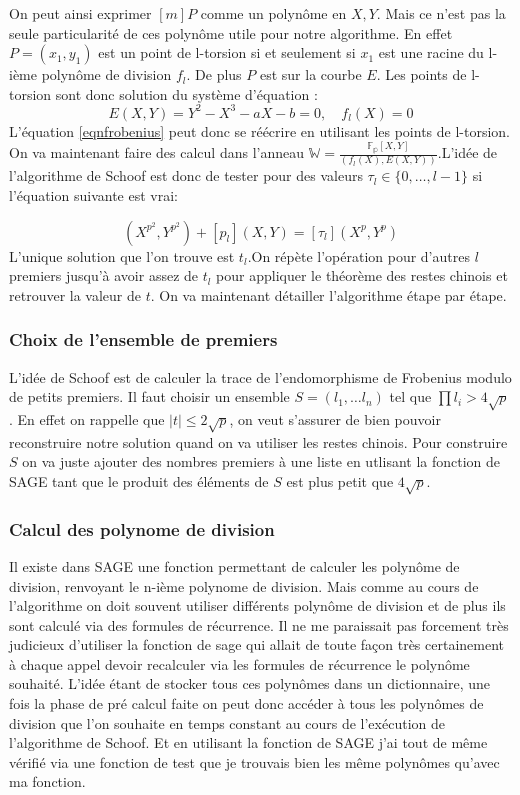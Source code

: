 \documentclass{article}
\begin{document}
On peut ainsi exprimer $[m]P$ comme un polynôme en $X,Y$. Mais ce n'est pas la seule particularité de ces polynôme utile pour notre algorithme. En effet $P = (x_1, y_1)$ est un point de l-torsion si et seulement si $x_1$ est une racine du l-ième polynôme de division $f_l$. De plus $P$ est sur la courbe $E$. Les points de l-torsion sont donc solution du système d'équation : 
\begin{equation}
E(X,Y) = Y^2 - X^3 - aX - b = 0, \quad f_l(X) = 0
\end{equation}
L'équation \ref{eqnfrobenius} peut donc se réécrire en utilisant les points de l-torsion. On va maintenant faire des calcul dans l'anneau $\mathbb{W}= \frac{\mathbb{F_p}[X,Y]}{(f_l(X), E(X,Y))}$.L'idée de l'algorithme de Schoof est donc de tester pour des valeurs $\tau_l \in \lbrace 0, \ldots, l-1 \rbrace$ si l'équation suivante est vrai:

\begin{equation}
(X^{p^2}, Y^{p^2}) + [p_l](X,Y) = [\tau_l](X^{p}, Y^{p})
\end{equation}
L'unique solution que l'on trouve est $t_l$.On répète l'opération pour d'autres $l$ premiers jusqu'à avoir assez de $t_l$ pour appliquer le théorème des restes chinois et retrouver la valeur de $t$.
\newline
\medskip
On va maintenant détailler l'algorithme étape par étape. 


\subsubsection{Choix de l'ensemble de premiers}
L'idée de Schoof est de calculer la trace de l'endomorphisme de Frobenius modulo de petits premiers. Il faut choisir un ensemble $S = (l_1, \ldots l_n)$ tel que $\prod l_i > 4\sqrt{p}$. En effet on rappelle que  $|t| \leq 2 \sqrt{p}$, on veut s'assurer de bien pouvoir reconstruire notre solution quand on va utiliser les restes chinois. Pour construire $S$ on va juste ajouter des nombres premiers à une liste en utlisant la fonction  de SAGE tant que le produit des éléments de $S$ est plus petit que $ 4\sqrt{p}$.


\subsubsection{Calcul des polynome de division}
Il existe dans SAGE une fonction permettant de calculer les polynôme de division,  renvoyant le n-ième polynome de division. Mais comme au cours de l'algorithme on doit souvent utiliser différents polynôme de division et de plus ils sont calculé via des formules de récurrence. Il ne me paraissait pas forcement très judicieux d'utiliser la fonction de sage qui allait de toute façon très certainement à chaque appel devoir recalculer via les formules de récurrence le polynôme souhaité. L'idée étant de stocker tous ces polynômes dans un dictionnaire, une fois la phase de pré calcul faite on peut donc accéder à tous les polynômes de division que l'on souhaite en temps constant au cours de l’exécution de l'algorithme de Schoof. Et en utilisant la fonction de SAGE j'ai tout de même vérifié via une fonction de test que je trouvais bien les même polynômes qu'avec ma fonction.
\end{document}
